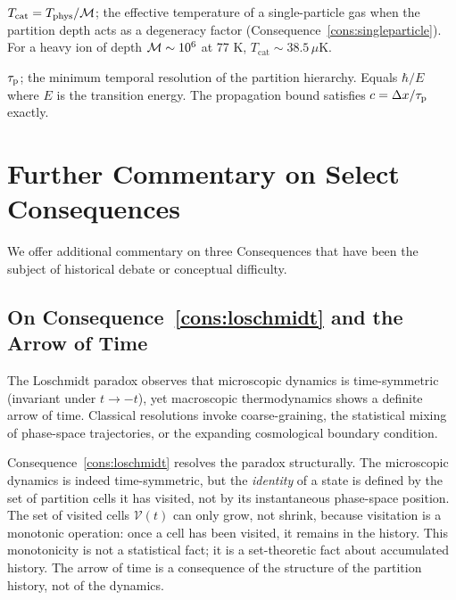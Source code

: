 \begin{description}[leftmargin=0pt, itemsep=6pt]
  \item[Categorical temperature.]
    $T_{\text{cat}}=T_{\text{phys}}/\mathcal{M}$; the effective temperature of a
    single-particle gas when the partition depth acts as a degeneracy factor
    (Consequence~\ref{cons:singleparticle}).  For a heavy ion of depth
    $\mathcal{M}\sim 10^{6}$ at 77 K, $T_{\text{cat}}\sim 38.5\,\mu$K.

  \item[Partition lag time.]
    $\tau_{\mathrm{p}}$; the minimum temporal resolution of the partition hierarchy.
    Equals $\hbar/E$ where $E$ is the transition energy.  The propagation
    bound satisfies $c=\Delta x/\tau_{\mathrm{p}}$ exactly.

\end{description}

\section*{Further Commentary on Select Consequences}

We offer additional commentary on three Consequences that have been the
subject of historical debate or conceptual difficulty.

\subsection*{On Consequence~\ref{cons:loschmidt} and the Arrow of Time}

The Loschmidt paradox observes that microscopic dynamics is time-symmetric
(invariant under $t\to -t$), yet macroscopic thermodynamics shows a
definite arrow of time.  Classical resolutions invoke coarse-graining, the
statistical mixing of phase-space trajectories, or the expanding
cosmological boundary condition.

Consequence~\ref{cons:loschmidt} resolves the paradox structurally.  The
microscopic dynamics is indeed time-symmetric, but the \emph{identity} of a
state is defined by the set of partition cells it has visited, not by its
instantaneous phase-space position.  The set of visited cells
$\mathcal{V}(t)$ can only grow, not shrink, because visitation is a
monotonic operation: once a cell has been visited, it remains in the
history.  This monotonicity is not a statistical fact; it is a
set-theoretic fact about accumulated history.  The arrow of time is a
consequence of the structure of the partition history, not of the dynamics.

